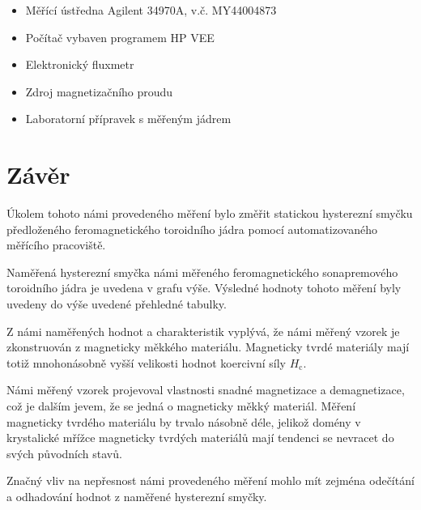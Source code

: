 \documentclass[a4paper, czech]{article}
\begin{document}
\begin{itemize}
    \item Měřící ústředna Agilent 34970A, v.č. MY44004873
    \item Počítač vybaven programem HP VEE
    \item Elektronický fluxmetr
    \item Zdroj magnetizačního proudu
    \item Laboratorní přípravek s měřeným jádrem
\end{itemize}

\section{Závěr}

Úkolem tohoto námi provedeného měření bylo změřit statickou hysterezní smyčku předloženého feromagnetického toroidního jádra pomocí automatizovaného měřícího pracoviště.

Naměřená hysterezní smyčka námi měřeného feromagnetického sonapremového toroidního jádra je uvedena v grafu výše.
Výsledné hodnoty tohoto měření byly uvedeny do výše uvedené přehledné tabulky.

Z námi naměřených hodnot a charakteristik vyplývá, že námi měřený vzorek je zkonstruován z magneticky měkkého materiálu.
Magneticky tvrdé materiály mají totiž mnohonásobně vyšší velikosti hodnot koercivní síly $H_\text{c}$.

Námi měřený vzorek projevoval vlastnosti snadné magnetizace a demagnetizace, což je dalším jevem, že se jedná o magneticky měkký materiál.
Měření magneticky tvrdého materiálu by trvalo násobně déle, jelikož domény v krystalické mřížce magneticky tvrdých materiálů mají tendenci se nevracet do svých původních stavů.

Značný vliv na nepřesnost námi provedeného měření mohlo mít zejména odečítání a odhadování hodnot z naměřené hysterezní smyčky.
\end{document}
